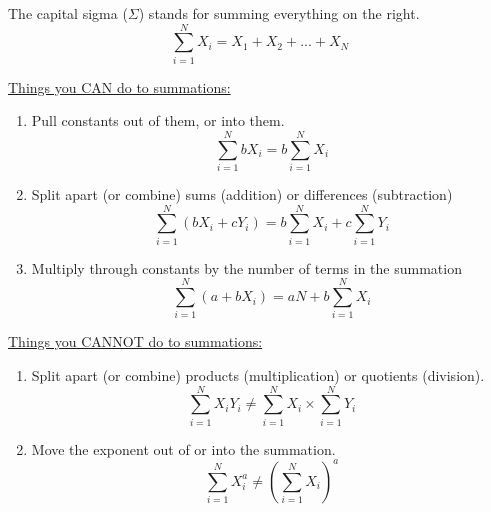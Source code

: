\documentclass{./../handout}
\begin{document}
\thispagestyle{plain}
\begin{center}
\end{center}	

The capital sigma ($\Sigma$) stands for summing everything on the right. 
$$ \sum_{i=1}^N X_i = X_1 + X_2 + ... + X_N $$

\underline{Things you CAN do to summations:}
\begin{enumerate}
\item Pull constants out of them, or into them.
$$ \sum_{i=1}^N b X_i = b \sum_{i=1}^N X_i  $$
\item Split apart (or combine) sums (addition) or differences (subtraction)
$$ \sum_{i=1}^N (b X_i + c Y_i) = b \sum_{i=1}^N X_i  + c \sum_{i=1}^N Y_i $$
\item Multiply through constants by the number of terms in the summation
$$ \sum_{i=1}^N (a+b X_i)= aN + b \sum_{i=1}^N X_i  $$
\end{enumerate}

\underline{Things you CANNOT do to summations:}
\begin{enumerate}
\item Split apart (or combine) products (multiplication) or quotients (division).
$$ \sum_{i=1}^N X_i Y_i \neq  \sum_{i=1}^N X_i \times \sum_{i=1}^N Y_i   $$
\item Move the exponent out of or into the summation.
$$ \sum_{i=1}^N X_i^a \neq  \left(\sum_{i=1}^N X_i\right)^a $$
\end{enumerate}
\end{document}
